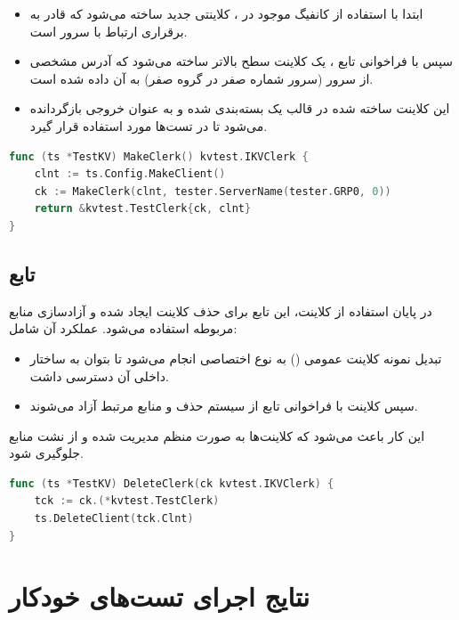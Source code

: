 \begin{itemize}
  \item ابتدا با استفاده از کانفیگ موجود در ، کلاینتی جدید ساخته می‌شود که قادر به برقراری ارتباط با سرور است.
  \item سپس با فراخوانی تابع ، یک کلاینت سطح بالاتر ساخته می‌شود که آدرس مشخصی از سرور (سرور شماره صفر در گروه صفر) به آن داده شده است.
  \item این کلاینت ساخته شده در قالب یک  بسته‌بندی شده و به عنوان خروجی بازگردانده می‌شود تا در تست‌ها مورد استفاده قرار گیرد.
\end{itemize}

\begin{latin}
\begin{lstlisting}[language=Go]
func (ts *TestKV) MakeClerk() kvtest.IKVClerk {
    clnt := ts.Config.MakeClient()
    ck := MakeClerk(clnt, tester.ServerName(tester.GRP0, 0))
    return &kvtest.TestClerk{ck, clnt}
}
\end{lstlisting}
\end{latin}

\subsection*{تابع }

در پایان استفاده از کلاینت، این تابع برای حذف کلاینت ایجاد شده و آزادسازی منابع مربوطه استفاده می‌شود. عملکرد آن شامل:

\begin{itemize}
  \item تبدیل نمونه کلاینت عمومی () به نوع اختصاصی  انجام می‌شود تا بتوان به ساختار داخلی آن دسترسی داشت.
  \item سپس کلاینت با فراخوانی تابع  از سیستم حذف و منابع مرتبط آزاد می‌شوند.
\end{itemize}

این کار باعث می‌شود که کلاینت‌ها به صورت منظم مدیریت شده و از نشت منابع جلوگیری شود.

\begin{latin}
\begin{lstlisting}[language=Go]
func (ts *TestKV) DeleteClerk(ck kvtest.IKVClerk) {
    tck := ck.(*kvtest.TestClerk)
    ts.DeleteClient(tck.Clnt)
}
\end{lstlisting}
\end{latin}

\section*{نتایج اجرای تست‌های خودکار}


